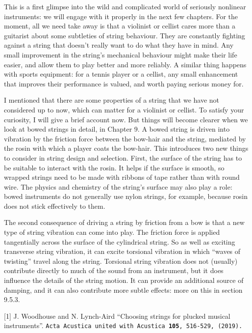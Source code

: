   This is a first glimpse into the wild and complicated world of seriously 
  nonlinear instruments: we will engage with it properly in the next few 
  chapters. For the moment, all we need take away is that a violinist or 
  cellist cares more than a guitarist about some subtleties of string 
  behaviour. They are constantly fighting against a string that doesn’t really 
  want to do what they have in mind. Any small improvement in the string’s 
  mechanical behaviour might make their life easier, and allow them to play 
  better and more reliably. A similar thing happens with sports equipment: for 
  a tennis player or a cellist, any small enhancement that improves their 
  performance is valued, and worth paying serious money for. 

  I mentioned that there are some properties of a string that we have not 
  considered up to now, which can matter for a violinist or cellist. To satisfy 
  your curiosity, I will give a brief account now. But things will become 
  clearer when we look at bowed strings in detail, in Chapter 9. A bowed string 
  is driven into vibration by the friction force between the bow-hair and the 
  string, mediated by the rosin with which a player coats the bow-hair. This 
  introduces two new things to consider in string design and selection. First, 
  the surface of the string has to be suitable to interact with the rosin. It 
  helps if the surface is smooth, so wrapped strings need to be made with 
  ribbons of tape rather than with round wire. The physics and chemistry of the 
  string's surface may also play a role: bowed instruments do not generally use 
  nylon strings, for example, because rosin does not stick effectively to them. 

  The second consequence of driving a string by friction from a bow is that a 
  new type of string vibration can come into play. The friction force is 
  applied tangentially across the surface of the cylindrical string. So as well 
  as exciting transverse string vibration, it can excite torsional vibration in 
  which ``waves of twisting'' travel along the string. Torsional string 
  vibration does not (usually) contribute directly to much of the sound from an 
  instrument, but it does influence the details of the string motion. It can 
  provide an additional source of damping, and it can also contribute more 
  subtle effects: more on this in section 9.5.3. 



  \sectionreferences{}[1] J. Woodhouse and N. Lynch-Aird ``Choosing strings for 
  plucked musical instruments''. \tt{}Acta Acustica united with Acustica 
  \textbf{105}, 516-529, (2019)\rm{}.~ 